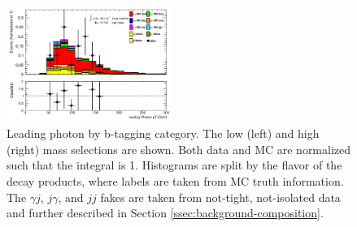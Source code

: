\begin{figure}[p]
  \includegraphics[width=0.48\textwidth]{chapters/chapter5_yybb/images/data_MC_comparison/h_SR_h_2t_nominal_leadingPhoton_pt.pdf}
  \caption[Leading photon \pt by \btagging category]{Leading photon \pt by b-tagging category. The low (left) and high (right) mass selections are shown. Both data and MC are normalized such that the integral is 1. Histograms are split by the flavor of the \Hbb decay products, where labels are taken from \gls{MC} truth information. The $\gamma j$, $j\gamma$, and $jj$ fakes are taken from not-tight, not-isolated data and further described in Section \ref{ssec:background-composition}.
  \label{fig:photon_l_pt}}
\end{figure}

